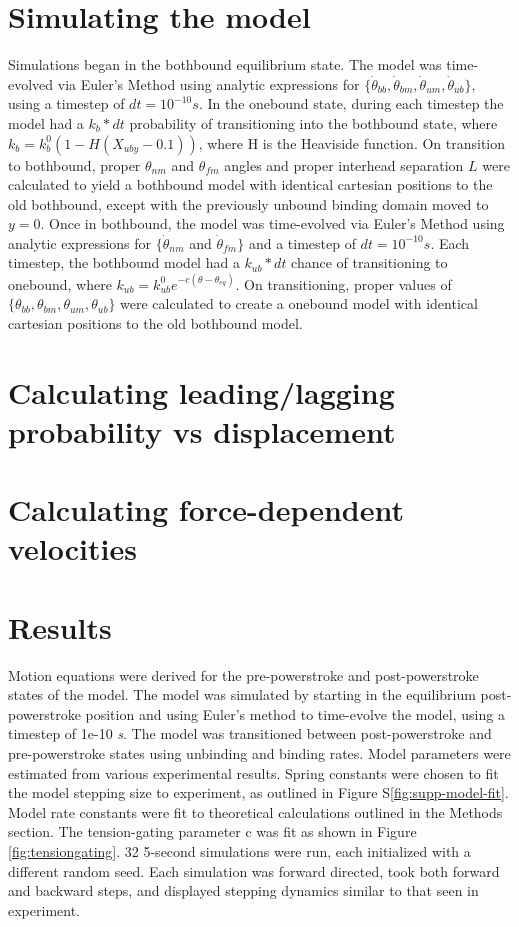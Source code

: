 \documentclass[9pt,twocolumn,twoside]{pnas-new}
\begin{document}
{  \section*{Simulating the model}
  Simulations began in the bothbound equilibrium state. The model was time-evolved via Euler's Method using analytic expressions for $\{\dot{\theta}_{bb}, \dot{\theta}_{bm}, \dot{\theta}_{um}, \dot{\theta}_{ub}\}$, using a timestep of $dt = 10^{-10}s$. In the onebound state, during each timestep the model had a $k_b*dt$ probability of transitioning into the bothbound state, where $k_b = k_b^0\left(1-H\left(X_{uby}-0.1\right)\right)$, where H is the Heaviside function. On transition to bothbound, proper $\theta_{nm}$ and $\theta_{fm}$ angles and proper interhead separation $L$ were calculated to yield a bothbound model with identical cartesian positions to the old bothbound, except with the previously unbound binding domain moved to $y=0$. Once in bothbound, the model was time-evolved via Euler's Method using analytic expressions for $\{\dot{\theta}_{nm}$ and $\dot{\theta}_{fm}\}$ and a timestep of $dt=10^{-10}s$. Each timestep, the bothbound model had a $k_{ub}*dt$ chance of transitioning to onebound, where $k_{ub} = k^0_{ub}e^{-c(\theta-\theta_{eq})}$. On transitioning, proper values of $\{\theta_{bb}, \theta_{bm}, \theta_{um}, \theta_{ub}\}$ were calculated to create a onebound model with identical cartesian positions to the old bothbound model.\\

  \section*{Calculating leading/lagging probability vs displacement}

  \section*{Calculating force-dependent velocities}
}

\section{Results}

Motion equations were derived for the pre-powerstroke and post-powerstroke states of the model. The model was simulated by starting in the equilibrium post-powerstroke position and using Euler's method to time-evolve the model, using a timestep of 1e-10 \textit{s}. The model was transitioned between post-powerstroke and pre-powerstroke states using unbinding and binding rates. Model parameters were estimated from various experimental results. Spring constants were chosen to fit the model stepping size to experiment, as outlined in Figure S\ref{fig:supp-model-fit}. Model rate constants were fit to theoretical calculations outlined in the Methods section. The tension-gating parameter c was fit as shown in Figure \ref{fig:tensiongating}. 32 5-second simulations were run, each initialized with a different random seed. Each simulation was forward directed, took both forward and backward steps, and displayed stepping dynamics similar to that seen in experiment.\\
\end{document}
